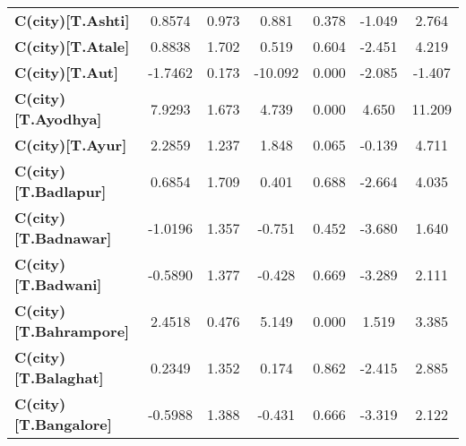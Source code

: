 \begin{center}
\begin{tabular}{lcccccc}
\textbf{C(city)[T.Ashti]}                                                                           &       0.8574  &        0.973     &     0.881  &         0.378        &       -1.049    &        2.764     \\
\textbf{C(city)[T.Atale]}                                                                           &       0.8838  &        1.702     &     0.519  &         0.604        &       -2.451    &        4.219     \\
\textbf{C(city)[T.Aut]}                                                                             &      -1.7462  &        0.173     &   -10.092  &         0.000        &       -2.085    &       -1.407     \\
\textbf{C(city)[T.Ayodhya]}                                                                         &       7.9293  &        1.673     &     4.739  &         0.000        &        4.650    &       11.209     \\
\textbf{C(city)[T.Ayur]}                                                                            &       2.2859  &        1.237     &     1.848  &         0.065        &       -0.139    &        4.711     \\
\textbf{C(city)[T.Badlapur]}                                                                        &       0.6854  &        1.709     &     0.401  &         0.688        &       -2.664    &        4.035     \\
\textbf{C(city)[T.Badnawar]}                                                                        &      -1.0196  &        1.357     &    -0.751  &         0.452        &       -3.680    &        1.640     \\
\textbf{C(city)[T.Badwani]}                                                                         &      -0.5890  &        1.377     &    -0.428  &         0.669        &       -3.289    &        2.111     \\
\textbf{C(city)[T.Bahrampore]}                                                                      &       2.4518  &        0.476     &     5.149  &         0.000        &        1.519    &        3.385     \\
\textbf{C(city)[T.Balaghat]}                                                                        &       0.2349  &        1.352     &     0.174  &         0.862        &       -2.415    &        2.885     \\
\textbf{C(city)[T.Bangalore]}                                                                       &      -0.5988  &        1.388     &    -0.431  &         0.666        &       -3.319    &        2.122     \\

\end{tabular}
\end{center}

